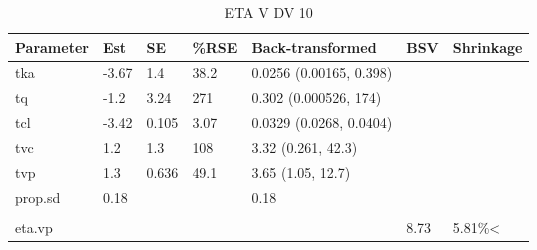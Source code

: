 \begin{table}
\centering\centering
\caption{ETA V DV 10}
\centering
\fontsize{8}{10}\selectfont
\begin{tabular}[t]{lllllll}
\toprule
\textbf{Parameter} & \textbf{Est} & \textbf{SE} & \textbf{\%RSE} & \textbf{Back-transformed} & \textbf{BSV} & \textbf{Shrinkage}\\
\midrule
tka & -3.67 & 1.4 & 38.2 & 0.0256 (0.00165, 0.398) &  & \\
\midrule
tq & -1.2 & 3.24 & 271 & 0.302 (0.000526, 174) &  & \\
\midrule
tcl & -3.42 & 0.105 & 3.07 & 0.0329 (0.0268, 0.0404) &  & \\
\midrule
tvc & 1.2 & 1.3 & 108 & 3.32 (0.261, 42.3) &  & \\
\midrule
tvp & 1.3 & 0.636 & 49.1 & 3.65 (1.05, 12.7) &  & \\
\midrule
prop.sd & 0.18 &  &  & 0.18 &  & \\
\midrule\\
eta.vp &  &  &  &  & 8.73 & 5.81\%<\\
\bottomrule
\end{tabular}
\end{table}